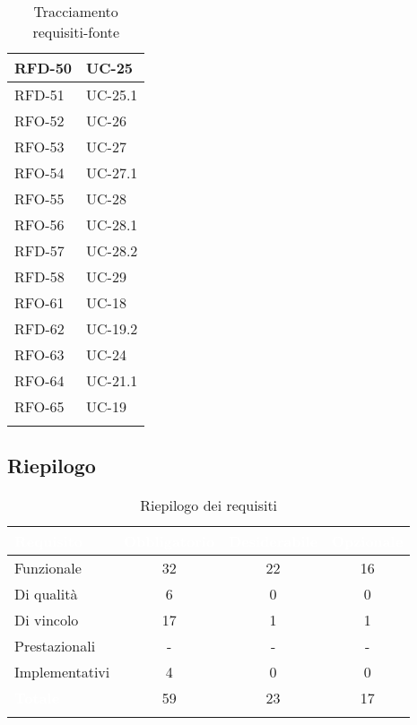 \begin{xltabular}{\textwidth}{|X | X|}
    \hline
    RFD-50 & UC-25 \\
    \hline
    RFD-51 & UC-25.1 \\
    \hline
    RFO-52 & UC-26 \\
    \hline
    RFO-53 & UC-27 \\
    \hline
    RFO-54 & UC-27.1 \\
    \hline
    RFO-55 & UC-28 \\
    \hline
    RFO-56 & UC-28.1 \\
    \hline
    RFD-57 & UC-28.2 \\
    \hline
    RFD-58 & UC-29 \\
    \hline
    RFO-61 & UC-18 \\
    \hline
    RFD-62 & UC-19.2 \\
    \hline
    RFO-63 & UC-24 \\
    \hline
    RFO-64 & UC-21.1 \\
    \hline
    RFO-65 & UC-19\\
\hline
     \caption{Tracciamento requisiti-fonte}
    \label{tab:riepilogo}
\end{xltabular}

\subsection{Riepilogo}
\begingroup
\setlength{\tabcolsep}{10pt}
\renewcommand{\arraystretch}{1.5}
\begin{xltabular}{\textwidth}{| X | c | c | c |}
    \hline
     \textbf{\textcolor{white}{Requisito}} & \textbf{\textcolor{white}{Obbligatorio}} & \textbf{\textcolor{white}{Desiderabile}} & \textbf{\textcolor{white}{Opzionale}}\\
    \hline
    \endhead
    Funzionale & 32 & 22 & 16 \\
    \hline
    Di qualità & 6 & 0 & 0 \\
    \hline
    Di vincolo & 17 & 1 & 1 \\
    \hline
    Prestazionali & - & - & - \\
    \hline
    Implementativi & 4 & 0 & 0 \\
    \hline
     \textbf{\textcolor{white}{Totale}} & 59 & 23 & 17 \\
    \hline
     \caption{Riepilogo dei requisiti}
    \label{tab:riepilogo}
\end{xltabular}
\endgroup



